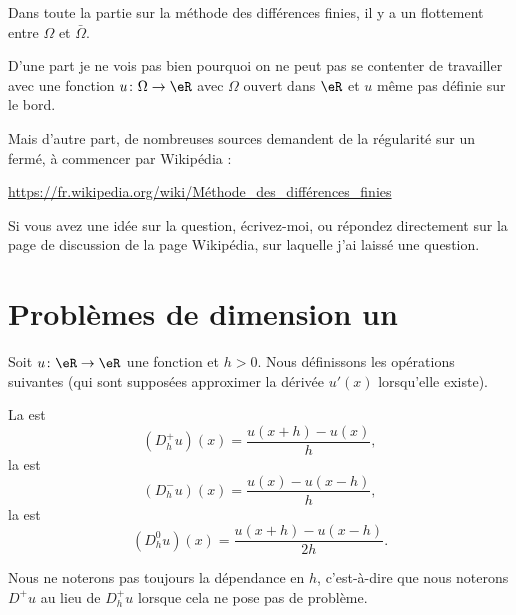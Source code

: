 
\begin{probleme}
	Dans toute la partie sur la méthode des différences finies, il y a un flottement entre \( \Omega\) et \( \bar \Omega\).

	D'une part je ne vois pas bien pourquoi on ne peut pas se contenter de travailler avec une fonction \( u\colon \Omega\to \eR\) avec \( \Omega\) ouvert dans \( \eR\) et \( u\) même pas définie sur le bord.

	Mais d'autre part, de nombreuses sources demandent de la régularité sur un fermé, à commencer par Wikipédia :

	\url{https://fr.wikipedia.org/wiki/Méthode_des_différences_finies}

	Si vous avez une idée sur la question, écrivez-moi, ou répondez directement sur la page de discussion de la page Wikipédia, sur laquelle j'ai laissé une question.
\end{probleme}

\section{Problèmes de dimension un}

Soit \( u\colon \eR\to \eR\) une fonction et \( h>0\). Nous définissons les opérations suivantes (qui sont supposées approximer la dérivée \( u'(x)\) lorsqu'elle existe).

\begin{definition}
	La  est
	\begin{equation}
		(D^+_hu)(x)=\frac{ u(x+h)-u(x) }{ h },
	\end{equation}
	la  est
	\begin{equation}
		(D^-_hu)(x)=\frac{ u(x)-u(x-h) }{ h },
	\end{equation}
	la  est
	\begin{equation}
		(D^0_hu)(x)=\frac{ u(x+h)-u(x-h) }{ 2h }.
	\end{equation}
\end{definition}
Nous ne noterons pas toujours la dépendance en \( h\), c'est-à-dire que nous noterons \( D^+u\) au lieu de \( D^+_hu\) lorsque cela ne pose pas de problème.

